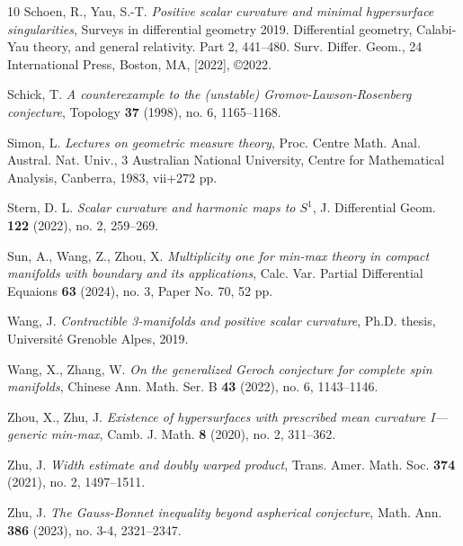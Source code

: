 \documentclass[11pt,letterpaper]{amsart}
\numberwithin{equation}{section}
\theoremstyle{definition}
\begin{document}
\begin{thebibliography}{10}
 Schoen, R., Yau, S.-T. {\em Positive scalar curvature and minimal hypersurface singularities}, Surveys in differential geometry 2019. Differential geometry, Calabi-Yau theory, and general relativity. Part 2, 441--480. Surv. Differ. Geom., 24 International Press, Boston, MA, [2022], \copyright 2022.

 Schick, T. {\em A counterexample to the (unstable) Gromov-Lawson-Rosenberg conjecture}, Topology {\bf 37} (1998), no. 6, 1165--1168.

 Simon, L. {\em Lectures on geometric measure theory}, Proc. Centre Math. Anal. Austral. Nat. Univ., 3 Australian National University, Centre for Mathematical Analysis, Canberra, 1983, vii+272 pp.

 Stern, D. L. {\em Scalar curvature and harmonic maps to $S^{1}$}, J. Differential Geom. {\bf 122} (2022), no. 2, 259--269.

 Sun, A., Wang, Z., Zhou, X. {\em Multiplicity one for min-max theory in compact manifolds with boundary and its applications}, Calc. Var. Partial Differential Equaions {\bf 63} (2024), no. 3, Paper No. 70, 52 pp.

 Wang, J. {\em Contractible 3-manifolds and positive scalar curvature}, Ph.D. thesis, Universit\'e Grenoble Alpes, 2019.

 Wang, X., Zhang, W. {\em On the generalized Geroch conjecture for complete spin manifolds}, Chinese Ann. Math. Ser. B {\bf 43} (2022), no. 6, 1143--1146.

Zhou, X., Zhu, J. {\em Existence of hypersurfaces with prescribed mean curvature {I}---generic min-max}, Camb. J. Math. {\bf 8} (2020), no. 2, 311--362.

 Zhu, J. {\em Width estimate and doubly warped product}, Trans. Amer. Math. Soc. {\bf 374} (2021), no. 2, 1497--1511.

 Zhu, J. {\em The Gauss-Bonnet inequality beyond aspherical conjecture}, Math. Ann. {\bf 386} (2023), no. 3-4, 2321--2347.

\end{thebibliography}
\end{document}
